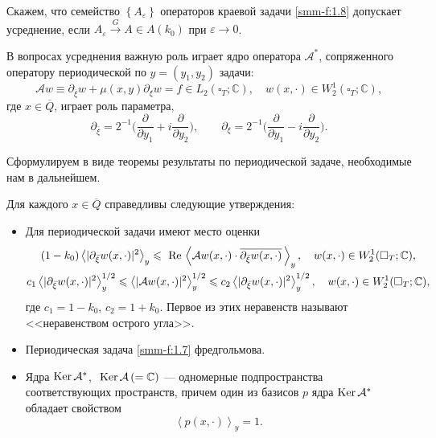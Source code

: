 \begin{definition}
	Скажем, что семейство $\left\{ A_\varepsilon \right\}$ операторов
краевой задачи \eqref{smm-f:1.8}  допускает усреднение, если $A_\varepsilon \overset{G}{\longrightarrow}A\in A(k_0) $ при
$\varepsilon\to 0$.
\end{definition}

	В вопросах усреднения важную роль играет ядро оператора $\mathcal{A}^*$, сопряженного оператору периодической по $y=(y_1,y_2)$ задачи:
	\begin{equation}\label{smm-f:1.7}
		\mathcal{A}w\equiv \partial_{\overline{\xi}}w +\mu(x,y) \partial_{\xi}w =f\in L_2(\square_T;\mathbb{C}),\quad
		w(x,\cdot)\in W_2^1(\square_T;\mathbb{C}),
	\end{equation}
	где $x\in \overline Q$, играет роль параметра,
	$$
	\partial_{\bar \xi}=2^{-1}\Big(\frac{\partial}{\partial y_1}+i\frac{\partial}{\partial y_2}\Big),\qquad  \partial_{\xi}=2^{-1}\Big(\frac{\partial}{\partial y_1}-i\frac{\partial}{\partial y_2}\Big).
	$$
	
	Сформулируем в виде теоремы результаты по периодической задаче, необходимые нам в дальнейшем.
	
	
\begin{theorem}\label{smm-th1.2}
Для каждого $x\in\overline Q$ справедливы следующие утверждения:
\begin{itemize}
\item  Для периодической задачи имеют место оценки
\begin{gather*}
	(1-k_0)\left<|\partial_{\bar{\xi}}w(x,\cdot)|^2\right>_y\leqslant \text{ Re\,}\left<\mathcal{A}w(x,\cdot)\cdot \overline{\partial_{\bar{\xi}}w(x,\cdot)}\,\right>_y,\quad  w(x,\cdot)\in W_2^1(\square_T;\mathbb{C}),\\
	c_1\left<|\partial_{\bar{\xi}}w(x,\cdot)|^2\right>_y^{1/2}\leqslant
	\left<|\mathcal{A}w(x,\cdot)|^2\right>_y^{1/2}\leqslant c_2\left<|\partial_{\bar{\xi}}w(x,\cdot)|^2\right>_y^{1/2}, \quad  w(x,\cdot)\in W_2^1(\square_T;\mathbb{C}),
\end{gather*}
где $c_1=1-k_0$, $c_2=1+k_0$. Первое из этих неравенств называют <<неравенством острого угла>>.
\item  Периодическая задача \eqref{smm-f:1.7} фредгольмова.
\item Ядра  $\text{Ker\,}\mathcal{A}^\ast$, $\text{ Ker\,}\mathcal{A}\,(=\mathbb{C})$
	--- одномерные подпространства соответствующих пространств,
	причем один из базисов $p$ ядра
	$\text{Ker\,}\mathcal{A}^\ast$ обладает свойством
	\begin{equation}\label{smm-df:1.10}
 \left< p(x,\cdot)\right>_y=1.
	\end{equation}
\end{itemize}
\end{theorem}

